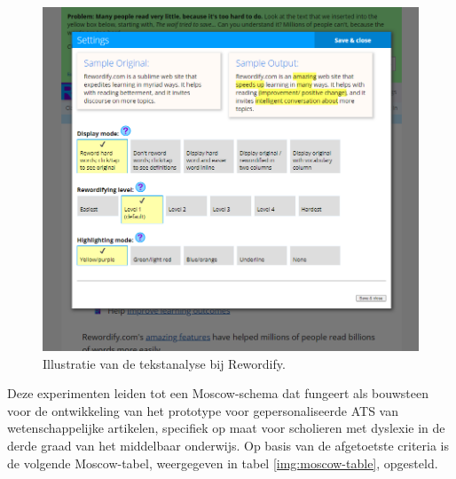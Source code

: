 \begin{figure}[H]
	\includegraphics[width=\linewidth]{img/scholarcy-attempt.png}
	\caption{Illustratie van de tekstanalyse bij Rewordify.}
	\label{img:scholarcy}
\end{figure}

\medspace

Deze experimenten leiden tot een Moscow-schema dat fungeert als bouwsteen voor de ontwikkeling van het prototype voor gepersonaliseerde ATS van wetenschappelijke artikelen, specifiek op maat voor scholieren met dyslexie in de derde graad van het middelbaar onderwijs. Op basis van de afgetoetste criteria is de volgende Moscow-tabel, weergegeven in tabel \ref{img:moscow-table}, opgesteld.

\medspace

